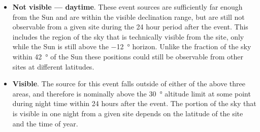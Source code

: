 \begin{colsection}
\begin{colsection}
\begin{itemize}
    \item \textbf{Not visible --- daytime}. These event sources are sufficiently far enough from the Sun and are within the visible declination range, but are still not observable from a given site during the 24 hour period after the event. This includes the region of the sky that is technically visible from the site, only while the Sun is still above the \SI{-12}{\degree} horizon. Unlike the fraction of the sky within \SI{42}{\degree} of the Sun these positions could still be observable from other sites at different latitudes.

    \item \textbf{Visible}. The source for this event falls outside of either of the above three areas, and therefore is nominally above the \SI{30}{\degree} altitude limit at some point during night time within 24 hours after the event. The portion of the sky that is visible in one night from a given site depends on the latitude of the site and the time of year.
\end{itemize}


\end{colsection}
\end{colsection}
